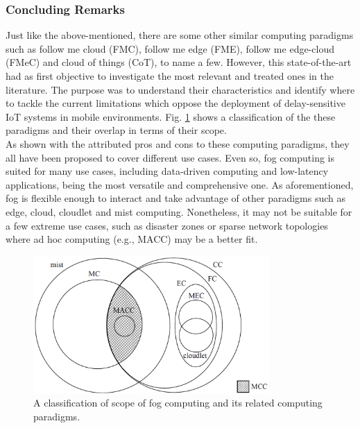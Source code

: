 \subsubsection{Concluding Remarks}
Just like the above-mentioned, there are some other similar computing paradigms such as follow me cloud (FMC), follow me edge (FME), follow me edge-cloud (FMeC) and cloud of things (CoT), to name a few. However, this state-of-the-art had as first objective to investigate the most relevant and treated ones in the literature. The purpose was to understand their characteristics and identify where to tackle the current limitations which oppose the deployment of delay-sensitive IoT systems in mobile environments. Fig. \ref{computing_paradigms} shows a classification of the these paradigms and their overlap in terms of their scope.\\
\noindent\tab As shown with the attributed pros and cons to these computing paradigms, they all have been proposed to cover different use cases. Even so, fog computing is suited for many use cases, including data-driven computing and low-latency applications, being the most versatile and comprehensive one. As aforementioned, fog is flexible enough to interact and take advantage of other paradigms such as edge, cloud, cloudlet and mist computing. Nonetheless, it may not be suitable for a few extreme use cases, such as disaster zones or sparse network topologies where ad hoc computing (e.g., MACC) may be a better fit.
\begin{figure}[t]
	\centering
	\includegraphics[width=90mm]{images/computing_paradigms}
	\caption{A classification of scope of fog computing and its related computing paradigms.\protect\footnotemark}
	\label{computing_paradigms}
\end{figure}
